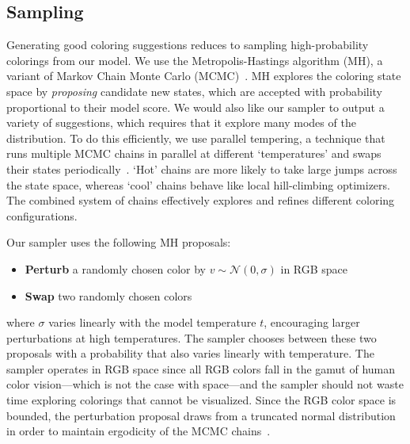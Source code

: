 \subsection{Sampling}
\label{sec:sampling}

Generating good coloring suggestions reduces to sampling high-probability colorings from our model. We use the Metropolis-Hastings algorithm (MH), a variant of Markov Chain Monte Carlo (MCMC)~\cite{Metropolis,Hastings}. MH explores the coloring state space by \emph{proposing} candidate new states, which are accepted with probability proportional to their model score. We would also like our sampler to output a variety of suggestions, which requires that it explore many modes of the distribution. To do this efficiently, we use parallel tempering, a technique that runs multiple MCMC chains in parallel at different `temperatures' and swaps their states periodically~\cite{ParallelTempering}. `Hot' chains are more likely to take large jumps across the state space, whereas `cool' chains behave like local hill-climbing optimizers. The combined system of chains effectively explores and refines different coloring configurations.

Our sampler uses the following MH proposals:
\begin{itemize}
	\item{\textbf{Perturb} a randomly chosen color by $v \sim \mathcal{N}(0, \sigma)$ in RGB space}
	\item{\textbf{Swap} two randomly chosen colors}
\end{itemize}
where $\sigma$ varies linearly with the model temperature $t$, encouraging larger perturbations at high temperatures. The sampler chooses between these two proposals with a probability that also varies linearly with temperature. The sampler operates in RGB space since all RGB colors fall in the gamut of human color vision---which is not the case with \lab space---and the sampler should not waste time exploring colorings that cannot be visualized. Since the RGB color space is bounded, the perturbation proposal draws from a truncated normal distribution in order to maintain ergodicity of the MCMC chains~\cite{TruncatedGaussians}.

